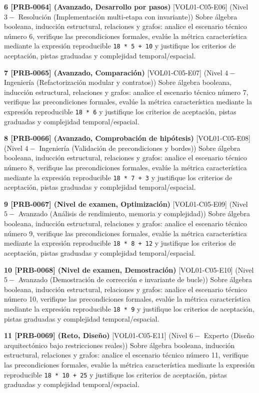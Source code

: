 \documentclass{book}
\begin{document}
\begin{tcolorbox}[title={Ejercicios}, studiumworked, breakable]
\noindent\textbf{6 [PRB-0064] (Avanzado, Desarrollo por pasos)}
[VOL01-C05-E06] (Nivel \(3 -\) Resolución (Implementación multi-etapa con invariante)) Sobre álgebra booleana, inducción estructural, relaciones y grafos: analice el escenario técnico número 6, verifique las precondiciones formales, evalúe la métrica característica mediante la expresión reproducible \texttt{18 * 5 + 10} y justifique los criterios de aceptación, pistas graduadas y complejidad temporal/espacial.

\noindent\textbf{7 [PRB-0065] (Avanzado, Comparación)}
[VOL01-C05-E07] (Nivel \(4 -\) Ingeniería (Refactorización modular y contratos)) Sobre álgebra booleana, inducción estructural, relaciones y grafos: analice el escenario técnico número 7, verifique las precondiciones formales, evalúe la métrica característica mediante la expresión reproducible \texttt{18 * 6} y justifique los criterios de aceptación, pistas graduadas y complejidad temporal/espacial.

\noindent\textbf{8 [PRB-0066] (Avanzado, Comprobación de hipótesis)}
[VOL01-C05-E08] (Nivel \(4 -\) Ingeniería (Validación de precondiciones y bordes)) Sobre álgebra booleana, inducción estructural, relaciones y grafos: analice el escenario técnico número 8, verifique las precondiciones formales, evalúe la métrica característica mediante la expresión reproducible \texttt{18 * 7 + 3} y justifique los criterios de aceptación, pistas graduadas y complejidad temporal/espacial.

\noindent\textbf{9 [PRB-0067] (Nivel de examen, Optimización)}
[VOL01-C05-E09] (Nivel \(5 -\) Avanzado (Análisis de rendimiento, memoria y complejidad)) Sobre álgebra booleana, inducción estructural, relaciones y grafos: analice el escenario técnico número 9, verifique las precondiciones formales, evalúe la métrica característica mediante la expresión reproducible \texttt{18 * 8 + 12} y justifique los criterios de aceptación, pistas graduadas y complejidad temporal/espacial.

\noindent\textbf{10 [PRB-0068] (Nivel de examen, Demostración)}
[VOL01-C05-E10] (Nivel \(5 -\) Avanzado (Demostración de corrección e invariante de bucle)) Sobre álgebra booleana, inducción estructural, relaciones y grafos: analice el escenario técnico número 10, verifique las precondiciones formales, evalúe la métrica característica mediante la expresión reproducible \texttt{18 * 9} y justifique los criterios de aceptación, pistas graduadas y complejidad temporal/espacial.

\noindent\textbf{11 [PRB-0069] (Reto, Diseño)}
[VOL01-C05-E11] (Nivel \(6 -\) Experto (Diseño arquitectónico bajo restricciones reales)) Sobre álgebra booleana, inducción estructural, relaciones y grafos: analice el escenario técnico número 11, verifique las precondiciones formales, evalúe la métrica característica mediante la expresión reproducible \texttt{18 * 10 + 25} y justifique los criterios de aceptación, pistas graduadas y complejidad temporal/espacial.


\end{tcolorbox}
\end{document}
